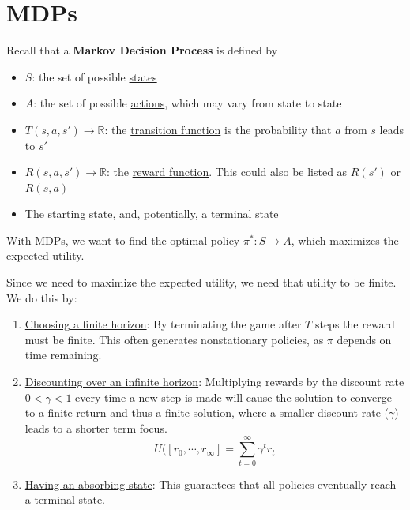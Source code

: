 \documentclass[a4paper]{article}
\begin{document}
\section*{MDPs}
\renewcommand{\labelenumii}{\arabic{enumii}.}
\setlength{\parindent}{0pt}

Recall that a \textbf{Markov Decision Process} is defined by
\begin{itemize}
  \item $S$: the set of possible \underline{states}

  \item $A$: the set of possible \underline{actions}, which may vary
  from state to state

  \item $T(s, a, s') \rightarrow \mathbb{R}$:
  the \underline{transition function} is the probability
  that $a$ from $s$ leads to $s'$

  \item $R(s, a, s') \rightarrow \mathbb{R}$:
  the \underline{reward function}. This could also be
  listed as $R(s')$ or $R(s,a)$

  \item The \underline{starting state}, and, potentially, a \underline{terminal state}
\end{itemize}

With MDPs, we want to find the optimal policy $\pi^*: S \rightarrow A$,
which maximizes the expected utility.

Since we need to maximize the expected utility, we need that utility to be finite. We do this by:

\begin{enumerate}
  \item \underline{Choosing a finite horizon}: By terminating the game after $T$ steps the reward must be finite. This often generates nonstationary policies, as $\pi$ depends on time remaining.
  
  \item \underline{Discounting over an infinite horizon}: Multiplying rewards by the discount rate $0 < \gamma < 1$ every time a new step is made will cause the solution to converge to a finite return and thus a finite solution, where a smaller discount rate ($\gamma$) leads to a shorter term focus.
  $$U([r_0, \cdots, r_\infty]=\sum_{t=0}^\infty \gamma^tr_t$$

  \item \underline{Having an absorbing state}: This guarantees that all policies eventually reach a terminal state.
\end{enumerate}
\end{document}
